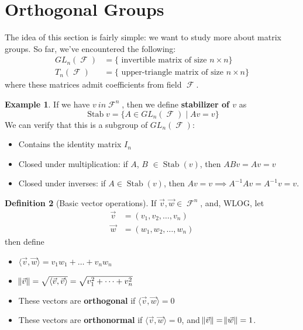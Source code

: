 \documentclass[11pt]{amsart} %
\theoremstyle{definition}
\newtheorem{definition}{Definition}[section]
\newtheorem{example}[definition]{Example}
\theoremstyle{definition}
\DeclareMathOperator{\FF}{\mathcal{F}}
\DeclareMathOperator{\stab}{Stab}
\numberwithin{equation}{section}
\begin{document}
\clearpage

\section{Orthogonal Groups}

The idea of this section is fairly simple: we want to study more about matrix groups. So far, we've encountered the following:
\begin{align*}
GL_n (\FF) &= \{\text{ invertible matrix of size } n \times n \} \\
T_n (\FF) &= \{\text{ upper-triangle matrix of size } n \times n \}
\end{align*}
where these matrices admit coefficients from field $\FF$.

\begin{example}
	If we have $v \ in \FF^n$, then we define \textbf{stabilizer of $v$} as
	$$ \stab v = \{ A \in GL_n (\FF) \mid Av = v \} $$
	We can verify that this is a subgroup of $GL_n (\FF)$:
	\begin{itemize}%
		\item Contains the identity matrix $I_n$
		\item Closed under multiplication: if $A$, $B$ $\in \stab (v)$, then $ABv = Av = v$
 		\item Closed under inverses: if $A \in \stab (v)$, then $Av = v \implies A^{-1} Av = A^{-1} v = v$.
	\end{itemize}
\end{example}

\begin{definition}[Basic vector operations]
	If $\vec{v}, \vec{w} \in \FF^n$, and, WLOG, let
	\begin{align*}
		\vec{v} &= (v_1,v_2,\dots,v_n)\\
		\vec{w} &= (w_1,w_2,\dots,w_n)		
	\end{align*}
	then define
	\begin{itemize}%
		\item $\langle \vec{v},\vec{w} \rangle = v_1 w_1 + \dots + v_n w_n $
		\item $\norm{\vec{v}} = \sqrt{ \langle \vec{v},\vec{v} \rangle } = \sqrt{v_1^2 + \dots + v_n^2}$
		\item These vectors are \textbf{orthogonal} if $\langle \vec{v},\vec{w} \rangle = 0$
		\item These vectors are \textbf{orthonormal} if $\langle \vec{v},\vec{w} \rangle = 0$, and $\norm{\vec{v}}= \norm{\vec{w}}= 1$.
	\end{itemize}
\end{definition}
\end{document}
